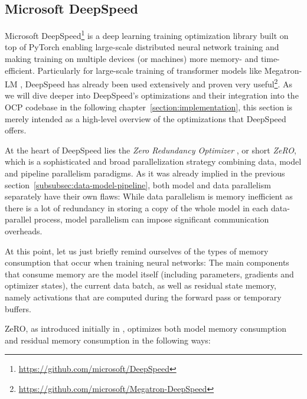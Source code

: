 \subsection{Microsoft DeepSpeed}

Microsoft DeepSpeed\footnote{\url{https://github.com/microsoft/DeepSpeed}} is
a deep learning training optimization library built on top of PyTorch enabling
large-scale distributed neural network training and making training on multiple devices 
(or machines) more memory- and time-efficient. Particularly for large-scale training of
transformer models like Megatron-LM \cite{10.48550/ARXIV.1909.08053}, DeepSpeed has
already been used extensively and proven very 
useful\footnote{\url{https://github.com/microsoft/Megatron-DeepSpeed}}.
As we will dive deeper into DeepSpeed's optimizations and their integration 
into the OCP codebase in the following chapter~\ref{section:implementation}, this 
section is merely intended as a high-level overview of the optimizations that 
DeepSpeed offers.

At the heart of DeepSpeed lies the \textit{Zero Redundancy Optimizer} 
\cite{https://doi.org/10.48550/arxiv.1910.02054,DBLP:journals/corr/abs-2101-06840,DBLP:journals/corr/abs-2104-07857},
or short \textit{ZeRO}, which is a sophisticated and broad parallelization strategy 
combining data, model and pipeline parallelism paradigms.
As it was already implied in the previous section~\ref{subsubsec:data-model-pipeline},
both model and data parallelism separately have their own flaws: While data parallelism
is memory inefficient as there is a lot of redundancy in storing a copy of the whole 
model in each data-parallel process, model parallelism can impose significant communication
overheads. 

At this point, let us just briefly remind ourselves of the types of memory consumption 
that occur when training neural networks: The main components that consume memory are the 
model itself (including parameters, gradients and optimizer states), 
the current data batch, as well as residual state memory, namely activations that are 
computed during the forward pass or temporary buffers.

ZeRO, as introduced initially in \cite{https://doi.org/10.48550/arxiv.1910.02054},
optimizes both model memory consumption and residual memory consumption in the
following ways:

